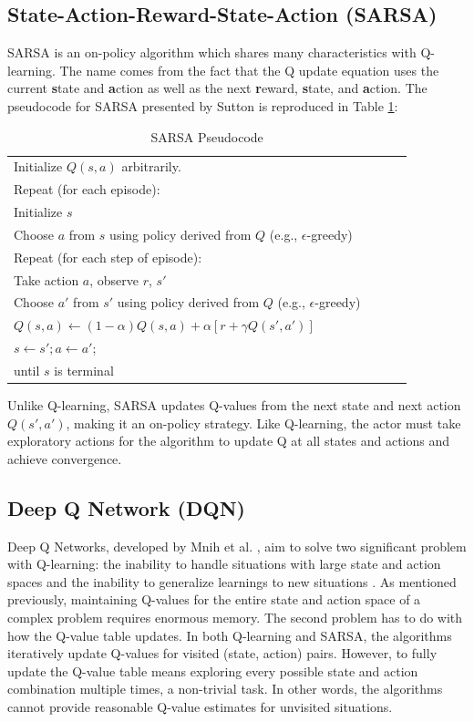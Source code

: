 \subsection{State-Action-Reward-State-Action (SARSA)}
SARSA is an on-policy algorithm which shares many characteristics with Q-learning. The name comes from the fact that the Q update equation uses the current \textbf{s}tate and \textbf{a}ction as well as the next \textbf{r}eward, \textbf{s}tate, and \textbf{a}ction. The pseudocode for SARSA presented by Sutton is reproduced in Table \ref{tab:sarsa}:
\begin{table}[h]
	\caption{SARSA Pseudocode}  \label{tab:sarsa}
	\begin{tabular}{|p{0.9\linewidth}|}\hline %
		Initialize $Q(s,a)$ arbitrarily. \\
		Repeat (for each episode): \\
		\qquad Initialize $s$\\
		\qquad Choose $a$ from $s$ using policy derived from $Q$ (e.g., $\epsilon$-greedy)\\
		\qquad Repeat (for each step of episode):\\
		\qquad \qquad Take action $a$, observe $r$, $s'$\\
		\qquad \qquad Choose $a'$ from $s'$ using policy derived from $Q$ (e.g., $\epsilon$-greedy)\\
		\qquad \qquad $	Q(s,a)\gets (1-\alpha)Q(s,a) + \alpha [r + \gamma Q(s',a')]$\\
		\qquad \qquad $s \gets s'; a \gets a'$;\\
		\qquad until $s$ is terminal \\
		\hline
	\end{tabular}
\end{table}

Unlike Q-learning, SARSA updates Q-values from the next state and next action $Q(s',a')$, making it an on-policy strategy. Like Q-learning, the actor must take exploratory actions for the algorithm to update Q at all states and actions and achieve convergence.

\subsection{Deep Q Network (DQN)}
Deep Q Networks, developed by Mnih et al. \cite{Mnih_2015}, aim to solve two significant problem with Q-learning: the inability to handle situations with large state and action spaces and the inability to generalize learnings to new situations \cite{sutton_policygrad}. As mentioned previously, maintaining Q-values for the entire state and action space of a complex problem requires enormous memory. The second problem has to do with how the Q-value table updates. In both Q-learning and SARSA, the algorithms iteratively update Q-values for visited (state, action) pairs. However, to fully update the Q-value table means exploring every possible state and action combination multiple times, a non-trivial task. In other words, the algorithms cannot provide reasonable Q-value estimates for unvisited situations.

